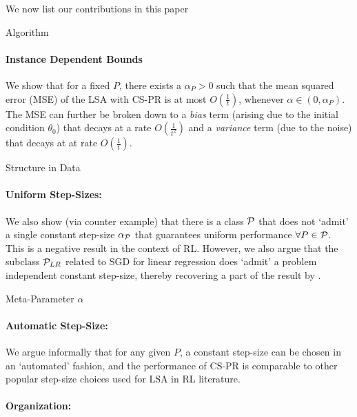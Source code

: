 We now list our contributions in this paper
 \begin{center}Algorithm\end{center}
\paragraph{Instance Dependent Bounds} We show that for a fixed $P$, there exists a $\alpha_P>0$ such that the mean squared error (MSE) of the LSA with CS-PR is at most $O(\frac{1}{t})$, whenever $\alpha\in (0,\alpha_P)$. The MSE can further be broken down to a \emph{bias} term (arising due to the initial condition $\theta_0$) that decays at a rate $O(\frac{1}{t^2})$ and a \emph{variance} term (due to the noise) that decays at at rate $O(\frac{1}{t})$.
\begin{center} Structure in Data\end{center}
\paragraph{Uniform Step-Sizes:} We also show (via counter example) that there is a class $\P$ that does not `admit' a single constant step-size $\alpha_{\P}$ that guarantees uniform performance $\forall P\in \P$. This is a negative result in the context of RL. However,
we also argue that the subclass $\P_{LR}$ related to SGD for linear regression does `admit' a problem independent constant step-size, thereby recovering a part of the result by \citet{bach}.
\begin{center} Meta-Parameter $\alpha$\end{center}
\paragraph{Automatic Step-Size:} We argue informally that for any given $P$, a constant step-size can be chosen in an `automated' fashion, and the performance of CS-PR is comparable to other popular step-size choices used for LSA in RL literature.
\paragraph{Organization:}
